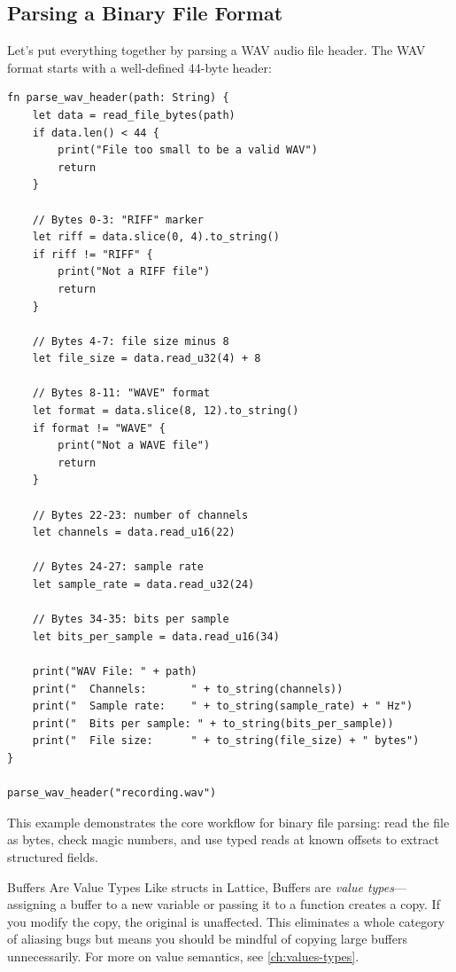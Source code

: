 \subsection{Parsing a Binary File Format}\label{sec:binary-format-example}

Let's put everything together by parsing a WAV audio file header. The WAV
format starts with a well-defined 44-byte header:

\begin{lstlisting}[language=Lattice, caption={Parsing a WAV file header}]
fn parse_wav_header(path: String) {
    let data = read_file_bytes(path)
    if data.len() < 44 {
        print("File too small to be a valid WAV")
        return
    }

    // Bytes 0-3: "RIFF" marker
    let riff = data.slice(0, 4).to_string()
    if riff != "RIFF" {
        print("Not a RIFF file")
        return
    }

    // Bytes 4-7: file size minus 8
    let file_size = data.read_u32(4) + 8

    // Bytes 8-11: "WAVE" format
    let format = data.slice(8, 12).to_string()
    if format != "WAVE" {
        print("Not a WAVE file")
        return
    }

    // Bytes 22-23: number of channels
    let channels = data.read_u16(22)

    // Bytes 24-27: sample rate
    let sample_rate = data.read_u32(24)

    // Bytes 34-35: bits per sample
    let bits_per_sample = data.read_u16(34)

    print("WAV File: " + path)
    print("  Channels:       " + to_string(channels))
    print("  Sample rate:    " + to_string(sample_rate) + " Hz")
    print("  Bits per sample: " + to_string(bits_per_sample))
    print("  File size:      " + to_string(file_size) + " bytes")
}

parse_wav_header("recording.wav")
\end{lstlisting}

This example demonstrates the core workflow for binary file parsing: read the
file as bytes, check magic numbers, and use typed reads at known offsets to
extract structured fields.

\begin{notebox}{Buffers Are Value Types}
Like structs in Lattice, Buffers are \emph{value types}---assigning a buffer
to a new variable or passing it to a function creates a copy. If you
modify the copy, the original is unaffected. This eliminates a whole category
of aliasing bugs but means you should be mindful of copying large buffers
unnecessarily. For more on value semantics, see \cref{ch:values-types}.
\end{notebox}


